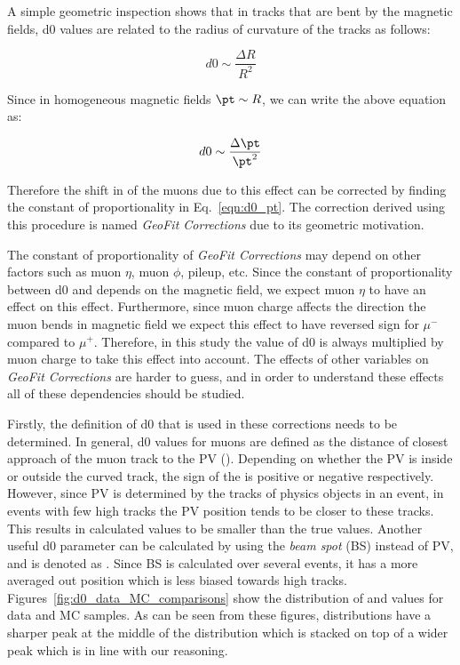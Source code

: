 A simple geometric inspection shows that in tracks that are bent by the magnetic fields, d0 values are related to the radius of curvature of the tracks as follows:

\begin{equation}
  d0 \sim \frac{\Delta R}{R^2}
\label{eqn:d0_R}
\end{equation} 

Since in homogeneous magnetic fields $\pt \sim R$, we can write the above equation as:

\begin{equation}
  d0 \sim \frac{\Delta \pt}{\pt^2} 
\label{eqn:d0_pt}
\end{equation}

Therefore the shift in \pt of the muons due to this effect can be corrected by finding the constant of proportionality in Eq.~\ref{eqn:d0_pt}. The correction derived using this procedure is named \textit{GeoFit Corrections} due to its geometric motivation. 

The constant of proportionality of \textit{GeoFit Corrections} may depend on other factors such as muon $\eta$, muon $\phi$, pileup, etc. Since the constant of proportionality between d0 and \pt depends on the magnetic field, we expect muon $\eta$ to have an effect on this effect. Furthermore, since muon charge affects the direction the muon bends in magnetic field we expect this effect to have reversed sign for $\mu^-$ compared to $\mu^+$. Therefore, in this study the value of d0 is always multiplied by muon charge to take this effect into account. The effects of other variables on \textit{GeoFit Corrections} are harder to guess, and in order to understand these effects all of these dependencies should be studied.

Firstly, the definition of d0 that is used in these corrections needs to be determined. In general, d0 values for muons are defined as the distance of closest approach of the muon track to the PV (\dzeroPV). Depending on whether the PV is inside or outside the curved track, the sign of the \dzeroPV is positive or negative respectively. However, since PV is determined by the tracks of physics objects in an event, in events with few high \pt tracks the PV position tends to be closer to these tracks. This results in calculated \dzeroPV values to be smaller than the true values. Another useful d0 parameter can be calculated by using the \textit{beam spot} (BS) instead of PV, and is denoted as \dzeroBS. Since BS is calculated over several events, it has a more averaged out position which is less biased towards high \pt tracks. Figures~\ref{fig:d0_data_MC_comparisons} show the distribution of \dzeroPV and \dzeroBS values for data and MC samples. As can be seen from these figures, \dzeroPV distributions have a sharper peak at the middle of the distribution which is stacked on top of a wider peak which is in line with our reasoning.

